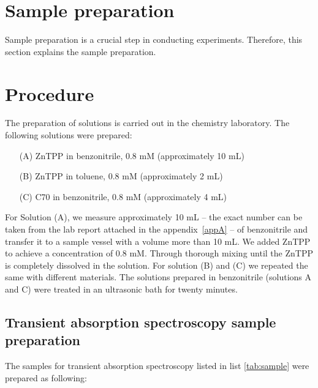 \section{Sample preparation}
\label{sec:Sampleprep}

Sample preparation is a crucial step in conducting experiments. Therefore, this section explains the sample preparation.

\section*{Procedure}

The preparation of solutions is carried out in the chemistry laboratory. The following solutions were prepared:

\begin{enumerate}
\item[(A)] ZnTPP in benzonitrile, 0.8 mM (approximately 10 mL)
\item[(B)] ZnTPP in toluene, 0.8 mM (approximately 2 mL)
\item[(C)] C70 in benzonitrile, 0.8 mM (approximately 4 mL)
\end{enumerate}

For Solution (A), we measure approximately 10 mL -- the exact number can be taken from the
lab report attached in the appendix~\ref{appA} -- of benzonitrile and transfer it to a sample vessel with a volume more than 10 mL.
We added ZnTPP to achieve a concentration of 0.8 mM. Through thorough mixing until the ZnTPP is completely
dissolved in the solution.
For solution (B) and (C) we repeated the same with different materials.
The solutions prepared in benzonitrile (solutions A and C) were treated in an ultrasonic bath for twenty minutes.


\subsection*{Transient absorption spectroscopy sample preparation}

The samples for transient absorption spectroscopy listed in list \cref{tab:sample} were prepared as following:



